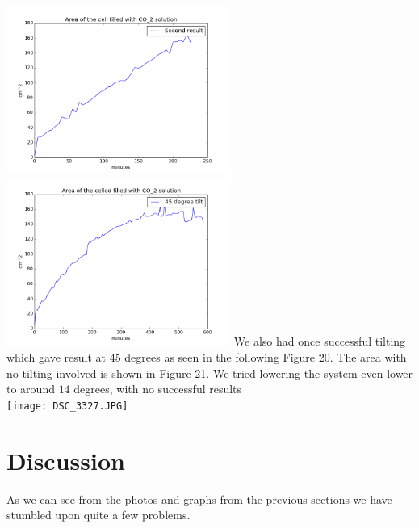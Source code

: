 \documentclass[twoside]{article}
\begin{document}
\begin{multicols}{2}
\includegraphics[width=0.55\textwidth]{area_2.png}\label{fig:area3_45}
\includegraphics[width=0.55\textwidth]{area_3.png}\label{fig:area2_good}
\vspace{0.1cm}
We also had once successful tilting which gave result at $45$ degrees as seen in the following Figure 20. The area with no tilting involved is shown in Figure 21.
We tried lowering the system even lower to around $14$ degrees, with no successful results\\

\texttt{[image: DSC\_3327.JPG]}\label{fig:14d}

\newpage
\section{Discussion}
As we can see from the photos and graphs from the previous sections we have stumbled upon quite a few problems. 

\end{multicols}
\end{document}
